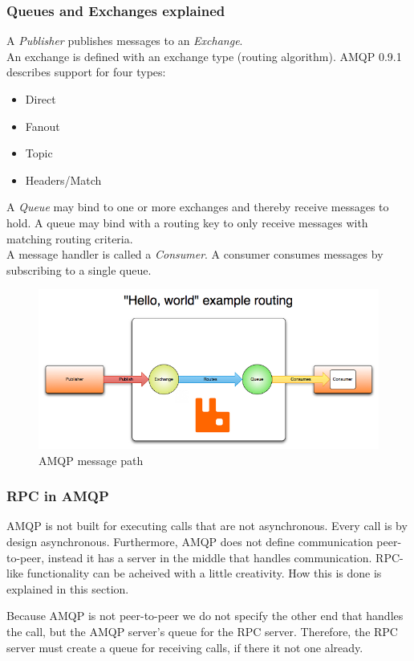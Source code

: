 \subsubsection{Queues and Exchanges explained}
A \textit{Publisher} publishes messages to an \textit{Exchange}.\\
An exchange is defined with an exchange type (routing algorithm). AMQP 0.9.1 describes support for four types\cite{Amqp091References}:
\begin{itemize}
\item Direct
\item Fanout
\item Topic
\item Headers/Match
\end{itemize}
A \textit{Queue} may bind to one or more exchanges and thereby receive messages to hold. A queue may bind with a routing key to only receive messages with matching routing criteria.\\
A message handler is called a \textit{Consumer}. A consumer consumes messages by subscribing to a single queue.
\begin{figure}[H]
  \includegraphics[width=\textwidth]{illustrations/publisher-exchange-queue-consumer.png}
  \caption{AMQP message path\cite{AmqpConcepts}}
\end{figure}

\subsubsection{RPC in AMQP}
AMQP is not built for executing calls that are not asynchronous. Every call is by design asynchronous. Furthermore, AMQP does not define communication peer-to-peer, instead it has a server in the middle that handles communication. RPC-like functionality can be acheived with a little creativity. How this is done is explained in this section.

Because AMQP is not peer-to-peer we do not specify the other end that handles the call, but the AMQP server's queue for the RPC server. Therefore, the RPC server must create a queue for receiving calls, if there it not one already.

